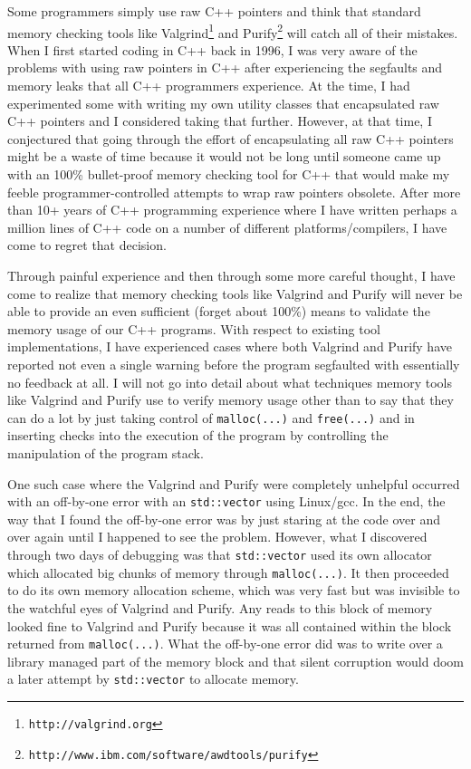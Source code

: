 \documentclass[pdf,ps2pdf,11pt]{SANDreport}
\begin{document}
Some programmers simply use raw C++ pointers and think that standard
memory checking tools like
Valgrind\footnote{{}\texttt{http://valgrind.org}} and
Purify\footnote{\texttt{http://www.ibm.com/software/awdtools/purify}}
will catch all of their mistakes.  When I first started coding in C++
back in 1996, I was very aware of the problems with using raw pointers
in C++ after experiencing the segfaults and memory leaks that all C++
programmers experience.  At the time, I had experimented some with
writing my own utility classes that encapsulated raw C++ pointers and
I considered taking that further.  However, at that time, I
conjectured that going through the effort of encapsulating all raw C++
pointers might be a waste of time because it would not be long until
someone came up with an 100\% bullet-proof memory checking tool for
C++ that would make my feeble programmer-controlled attempts to wrap
raw pointers obsolete.  After more than 10+ years of C++ programming
experience where I have written perhaps a million lines of C++ code on
a number of different platforms/compilers, I have come to regret that
decision.

Through painful experience and then through some more careful thought,
I have come to realize that memory checking tools like Valgrind and
Purify will never be able to provide an even sufficient (forget about
100\%) means to validate the memory usage of our C++ programs.  With
respect to existing tool implementations, I have experienced cases
where both Valgrind and Purify have reported not even a single warning
before the program segfaulted with essentially no feedback at all.  I
will not go into detail about what techniques memory tools like
Valgrind and Purify use to verify memory usage other than to say that
they can do a lot by just taking control of {}\texttt{malloc(...)} and
{}\texttt{free(...)} and in inserting checks into the execution of the
program by controlling the manipulation of the program stack.

One such case where the Valgrind and Purify were completely unhelpful
occurred with an off-by-one error with an {}\texttt{std::vector} using
Linux/gcc.  In the end, the way that I found the off-by-one error was
by just staring at the code over and over again until I happened to
see the problem.  However, what I discovered through two days of
debugging was that {}\texttt{std::vector} used its own allocator which
allocated big chunks of memory through {}\texttt{malloc(...)}.  It
then proceeded to do its own memory allocation scheme, which was very
fast but was invisible to the watchful eyes of Valgrind and Purify.
Any reads to this block of memory looked fine to Valgrind and Purify
because it was all contained within the block returned from
{}\texttt{malloc(...)}.  What the off-by-one error did was to write
over a library managed part of the memory block and that silent
corruption would doom a later attempt by {}\texttt{std::vector} to
allocate memory.
\end{document}
